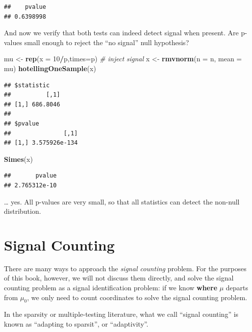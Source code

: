 \documentclass[]{book}
\newenvironment{Shaded}{\begin{snugshade}}{\end{snugshade}}
\newcommand{\CommentTok}[1]{\textcolor[rgb]{0.56,0.35,0.01}{\textit{#1}}}
\newcommand{\DataTypeTok}[1]{\textcolor[rgb]{0.13,0.29,0.53}{#1}}
\newcommand{\DecValTok}[1]{\textcolor[rgb]{0.00,0.00,0.81}{#1}}
\newcommand{\KeywordTok}[1]{\textcolor[rgb]{0.13,0.29,0.53}{\textbf{#1}}}
\newcommand{\NormalTok}[1]{#1}
\newcommand{\OperatorTok}[1]{\textcolor[rgb]{0.81,0.36,0.00}{\textbf{#1}}}
\newcommand{\StringTok}[1]{\textcolor[rgb]{0.31,0.60,0.02}{#1}}
\theoremstyle{definition}
\theoremstyle{definition}
\theoremstyle{definition}
\theoremstyle{remark}
\let\BeginKnitrBlock\begin \let\EndKnitrBlock\end
\begin{document}
\begin{verbatim}
##    pvalue 
## 0.6398998
\end{verbatim}

And now we verify that both tests can indeed detect signal when present. Are p-values small enough to reject the ``no signal'' null hypothesis?

\begin{Shaded}
\begin{Highlighting}[]
\NormalTok{mu <-}\StringTok{ }\KeywordTok{rep}\NormalTok{(}\DataTypeTok{x =} \DecValTok{10}\OperatorTok{/}\NormalTok{p,}\DataTypeTok{times=}\NormalTok{p) }\CommentTok{# inject signal}
\NormalTok{x <-}\StringTok{ }\KeywordTok{rmvnorm}\NormalTok{(}\DataTypeTok{n =}\NormalTok{ n, }\DataTypeTok{mean =}\NormalTok{ mu)}
\KeywordTok{hotellingOneSample}\NormalTok{(x)}
\end{Highlighting}
\end{Shaded}

\begin{verbatim}
## $statistic
##          [,1]
## [1,] 686.8046
## 
## $pvalue
##               [,1]
## [1,] 3.575926e-134
\end{verbatim}

\begin{Shaded}
\begin{Highlighting}[]
\KeywordTok{Simes}\NormalTok{(x)}
\end{Highlighting}
\end{Shaded}

\begin{verbatim}
##       pvalue 
## 2.765312e-10
\end{verbatim}

\ldots{} yes. All p-values are very small, so that all statistics can detect the non-null distribution.

\hypertarget{signal-counting}{%
\section{Signal Counting}\label{signal-counting}}

There are many ways to approach the \emph{signal counting} problem.
For the purposes of this book, however, we will not discuss them directly, and solve the signal counting problem as a signal identification problem: if we know \textbf{where} \(\mu\) departs from \(\mu_0\), we only need to count coordinates to solve the signal counting problem.

\BeginKnitrBlock{remark}
{}In the sparsity or multiple-testing literature, what we call ``signal counting'' is known as ``adapting to sparsit'', or ``adaptivity''.
\EndKnitrBlock{remark}
\end{document}
